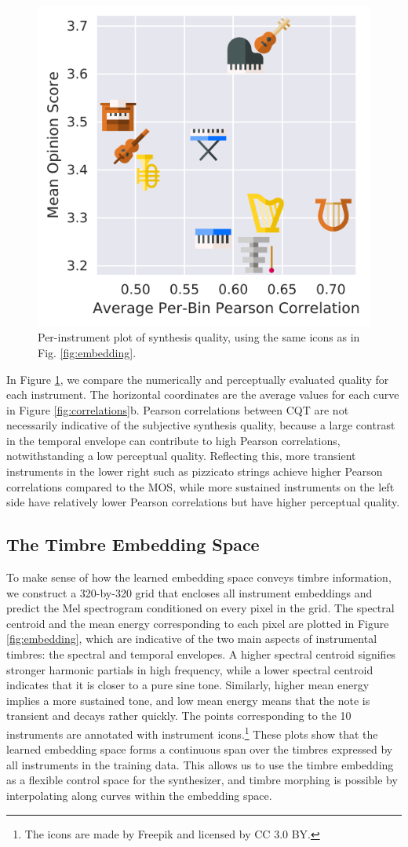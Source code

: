 \begin{figure}[t]
	\centering
	\includegraphics[width=0.4\linewidth]{scatter.pdf}
	\caption{Per-instrument plot of synthesis quality, using the same icons as in Fig. \ref{fig:embedding}.\newline}
	\label{fig:scatter}
	\vspace{-1em}
\end{figure}

In Figure \ref{fig:scatter}, we compare the numerically and perceptually evaluated quality for each instrument.
The horizontal coordinates are the average values for each curve in Figure \ref{fig:correlations}b.
Pearson correlations between CQT are not necessarily indicative of the subjective synthesis quality, because a large contrast in the temporal envelope can contribute to high Pearson correlations, notwithstanding a low perceptual quality.
Reflecting this, more transient instruments in the lower right such as pizzicato strings achieve higher Pearson correlations compared to the MOS, while more sustained instruments on the left side have relatively lower Pearson correlations but have higher perceptual quality.
\fi

\subsection{The Timbre Embedding Space}

To make sense of how the learned embedding space conveys timbre information, we construct a 320-by-320 grid that encloses all instrument embeddings and predict the Mel spectrogram conditioned on every pixel in the grid.
The spectral centroid and the mean energy corresponding to each pixel are plotted in Figure \ref{fig:embedding}, which are indicative of the two main aspects of instrumental timbres: the spectral and temporal envelopes.
A higher spectral centroid signifies stronger harmonic partials in high frequency, while a lower spectral centroid indicates that it is closer to a pure sine tone.
Similarly, higher mean energy implies a more sustained tone, and low mean energy means that the note is transient and decays rather quickly.
The points corresponding to the 10 instruments are annotated with instrument icons.\footnote{The icons are made by Freepik and licensed by CC 3.0 BY.}
These plots show that the learned embedding space forms a continuous span over the timbres expressed by all instruments in the training data.
This allows us to use the timbre embedding as a flexible control space for the synthesizer, and timbre morphing is possible by interpolating along curves within the embedding space.

